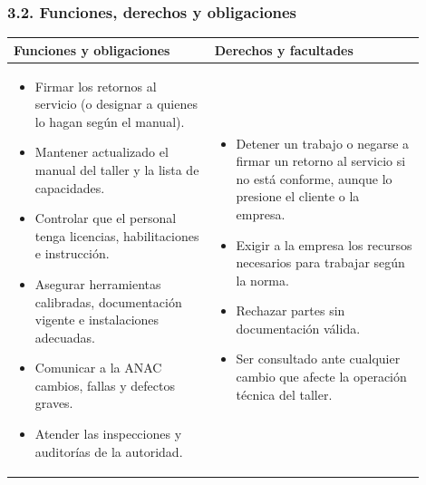 \subsubsection*{3.2. Funciones, derechos y obligaciones}
\begin{center}
\small
\begin{tabular}{|p{0.44\linewidth}|p{0.46\linewidth}|}
\hline
\textbf{Funciones y obligaciones} & \textbf{Derechos y facultades} \\ \hline
\begin{itemize}[leftmargin=*,nosep]
  \item Firmar los retornos al servicio (o designar a quienes lo hagan según el manual).
  \item Mantener actualizado el manual del taller y la lista de capacidades.
  \item Controlar que el personal tenga licencias, habilitaciones e instrucción.
  \item Asegurar herramientas calibradas, documentación vigente e instalaciones adecuadas.
  \item Comunicar a la ANAC cambios, fallas y defectos graves.
  \item Atender las inspecciones y auditorías de la autoridad.
\end{itemize}
&
\begin{itemize}[leftmargin=*,nosep]
  \item Detener un trabajo o negarse a firmar un retorno al servicio si no está conforme, aunque
        lo presione el cliente o la empresa.
  \item Exigir a la empresa los recursos necesarios para trabajar según la norma.
  \item Rechazar partes sin documentación válida.
  \item Ser consultado ante cualquier cambio que afecte la operación técnica del taller.
\end{itemize}
\\ \hline
\end{tabular}
\end{center}

